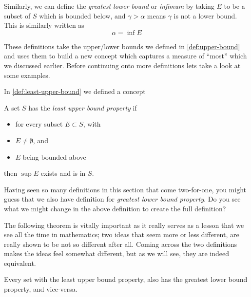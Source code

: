 Similarly, we can define the \emph{greatest lower bound} or \emph{infimum} by
taking $E$ to be a subset of $S$ which is bounded below, and $\gamma > \alpha$
means $\gamma$ is not a lower bound. This is similarly written as
\[\alpha = \inf{E}\]

These definitions take the upper/lower bounds we defined in \cref{def:upper-bound} and uses them to build a new concept which captures a
measure of ``most'' which we discussed earlier. Before continuing onto more
definitions lets take a look at some examples.

\begin{example}
\end{example}

In \cref{def:least-upper-bound} we defined a concept

\begin{definition}\label{def:least-upper-bound-prop}
    A set $S$ has the \emph{least upper bound property} if
    \begin{itemize}
        \item for every subset $E\subset S$, with
        \item $E\neq\emptyset$, and
        \item $E$ being bounded above
    \end{itemize}
    then $\sup{E}$ exists and is in $S$.
\end{definition}

Having seen so many definitions in this section that come two-for-one, you might
guess that we also have definition for \emph{greatest lower bound property}. Do
you see what we might change in the above definition to create the full
definition?

The following theorem is vitally important as it really serves as a lesson that
we see all the time in mathematics; two ideas that seem more or less different,
are really shown to be not so different after all. Coming across the two
definitions makes the ideas feel somewhat different, but as we will see, they
are indeed equivalent.

\begin{theorem}
    Every set with the least upper bound property, also has the greatest lower
    bound property, and vice-versa.
\end{theorem}

